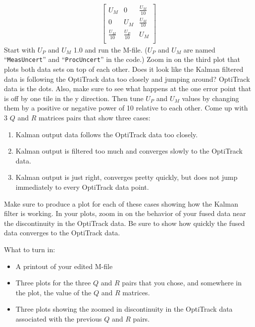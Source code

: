 \documentclass[11pt]{article}
\begin{document}
\begin{enumerate}
\begin{align*}
\begin{bmatrix}
                U_M & 0 & \frac{U_M}{10} \\
                0 & U_M & \frac{U_M}{10} \\
                \frac{U_M}{10} & \frac{U_P}{10} & U_M \\
            \end{bmatrix}
        \end{align*}
        Start with $U_P$ and $U_M$ 1.0 and run the M-file. ($U_P$  and $U_M$  are named “\verb|MeasUncert|” and “\verb|ProcUncert|” in the code.)  Zoom in on the third plot that plots both data sets on top of each other. Does it look like the Kalman filtered data is following the OptiTrack data too closely and jumping around? OptiTrack data is the dots. Also, make sure to see what happens at the one error point that is off by one tile in the y direction. Then tune $U_P$ and $U_M$ values by changing them by a positive or negative power of 10 relative to each other. Come up with 3 $Q$ and $R$ matrices pairs that show three cases:
        \begin{enumerate}
            \item Kalman output data follows the OptiTrack data too closely.
            \item Kalman output is filtered too much and converges slowly to the OptiTrack data.
            \item Kalman output is just right, converges pretty quickly, but does not jump immediately to every OptiTrack data point.
        \end{enumerate}
        Make sure to produce a plot for each of these cases showing how the Kalman filter is working. In your plots, zoom in on the behavior of your fused data near the discontinuity in the OptiTrack data. Be sure to show how quickly the fused data converges to the OptiTrack data.
\end{enumerate}
%
What to turn in:
%
\begin{itemize}
    \item A printout of your edited M-file
    \item Three plots for the three $Q$ and $R$ pairs that you chose, and somewhere in the plot, the value of the $Q$ and $R$ matrices.
    \item Three plots showing the zoomed in discontinuity in the OptiTrack data associated with the previous $Q$ and $R$ pairs.
\end{itemize}
%
\end{document}
